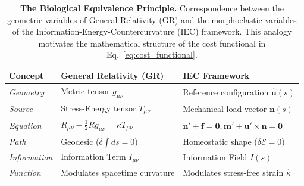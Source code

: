 \documentclass[11pt,a4paper]{article}
\begin{document}
\begin{table}[h!]
\centering
\caption{\textbf{The Biological Equivalence Principle.} Correspondence between the geometric variables of General Relativity (GR) and the morphoelastic variables of the Information-Energy-Countercurvature (IEC) framework. This analogy motivates the mathematical structure of the cost functional in Eq.~\ref{eq:cost_functional}.}
\label{tab:gr_analogy}
\small
\begin{tabular}{p{3cm} p{5cm} p{5cm}}
\toprule
\textbf{Concept} & \textbf{General Relativity (GR)} & \textbf{IEC Framework} \\
\midrule
\textit{Geometry} & Metric tensor $g_{\mu\nu}$ & Reference configuration $\hat{\mathbf{u}}(s)$ \\
\textit{Source} & Stress-Energy tensor $T_{\mu\nu}$ & Mechanical load vector $\mathbf{n}(s)$ \\
\textit{Equation} & $R_{\mu\nu} - \frac{1}{2}Rg_{\mu\nu} = \kappa T_{\mu\nu}$ & $\mathbf{n}' + \mathbf{f} = \mathbf{0}, \mathbf{m}' + \mathbf{u}' \times \mathbf{n} = \mathbf{0}$ \\
\textit{Path} & Geodesic ($\delta \int ds = 0$) & Homeostatic shape ($\delta \mathcal{E} = 0$) \\
\textit{Information} & Information Term $I_{\mu\nu}$ & Information Field $I(s)$ \\
\textit{Function} & Modulates spacetime curvature & Modulates stress-free strain $\hat{\kappa}$ \\
\bottomrule
\end{tabular}
\end{table}



\end{document}

